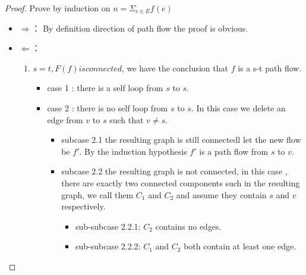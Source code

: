 \documentclass{article}
\newtheorem{proof}{Proof}[section]
\begin{document}
\begin{proof} Prove by induction on $n  = \Sigma_{e\in E} f(e)$\\
\begin{itemize}
\item $\Rightarrow$：
 By definition direction of path flow the proof is obvious.

\item $\Leftarrow$：
\begin{enumerate}
\item $s = t, F(f) is connected$, we have the conclusion that $f$ is a s-t path flow.

\begin{itemize}
\item case 1 : there is a self loop from $s$ to $s$.

\item case 2 : there is no self loop from $s$ to $s$. In this case we delete an edge from $v$ to $s$ such that $v \neq s$.

\begin{itemize}
\item subcase 2.1 the resulting graph is still connectedl let the new flow be $f'$. By the induction hypothesis $f'$ is a path flow from $s$ to $v$.

\item subcase 2.2 the resulting graph is not connected, in this case , there are exactly two connected components such in the resulting graph, we call them $C_1$ and $C_2$ and assume they contain $s$ and $v$ respectively.
\begin{itemize}
\item sub-subcase 2.2.1:
$C_2$ contains no edges.

\item sub-subcase 2.2.2:
$C_1$ and $C_2$ both contain at least one edge.

\end{itemize}
\end{itemize}
\end{itemize}

\end{enumerate}
\end{itemize}


\end{proof}
\end{document}
